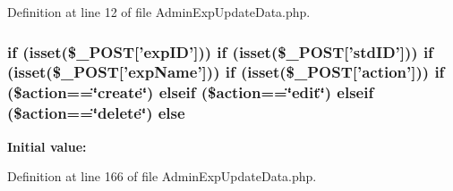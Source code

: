 Definition at line 12 of file Admin\-Exp\-Update\-Data.\-php.

\hypertarget{_admin_exp_update_data_8php_a34153a20a95674a0175d4c2447dc0a99}{
\subsubsection[{else}]{\setlength{\rightskip}{0pt plus 5cm}if (isset(\$\-\_\-\-P\-O\-S\-T\mbox{[}'{\bf exp\-I\-D}'\mbox{]})) if (isset(\$\-\_\-\-P\-O\-S\-T\mbox{[}'std\-I\-D'\mbox{]})) if (isset(\$\-\_\-\-P\-O\-S\-T\mbox{[}'exp\-Name'\mbox{]})) if (isset(\$\-\_\-\-P\-O\-S\-T\mbox{[}'action'\mbox{]})) if (\$action==\char`\"{}create\char`\"{}) elseif (\$action==\char`\"{}edit\char`\"{}) elseif (\$action==\char`\"{}delete\char`\"{}) else}}\label{_admin_exp_update_data_8php_a34153a20a95674a0175d4c2447dc0a99}
{\bfseries Initial value\-:}


Definition at line 166 of file Admin\-Exp\-Update\-Data.\-php.


